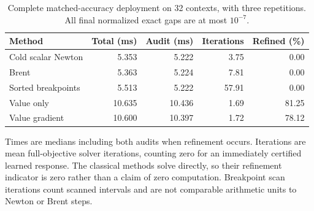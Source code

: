 \begin{table}[htbp]
\centering
\caption{Complete matched-accuracy deployment on 32 contexts, with three repetitions. All final normalized exact gaps are at most $10^{-7}$.}
\label{tab:r14-timing}
\begin{tabular}{lrrrr}
\toprule
Method & Total (ms) & Audit (ms) & Iterations & Refined (\%)\\
\midrule
Cold scalar Newton & 5.353 & 5.222 & 3.75 & 0.00\\
Brent & 5.363 & 5.224 & 7.81 & 0.00\\
Sorted breakpoints & 5.513 & 5.222 & 57.91 & 0.00\\
Value only & 10.635 & 10.436 & 1.69 & 81.25\\
Value gradient & 10.600 & 10.397 & 1.72 & 78.12\\
\bottomrule
\end{tabular}
\par\smallskip
\begin{minipage}{0.97\linewidth}
Times are medians including both audits when refinement occurs. Iterations are mean full-objective solver iterations, counting zero for an immediately certified learned response. The classical methods solve directly, so their refinement indicator is zero rather than a claim of zero computation. Breakpoint scan iterations count scanned intervals and are not comparable arithmetic units to Newton or Brent steps.
\end{minipage}
\end{table}
